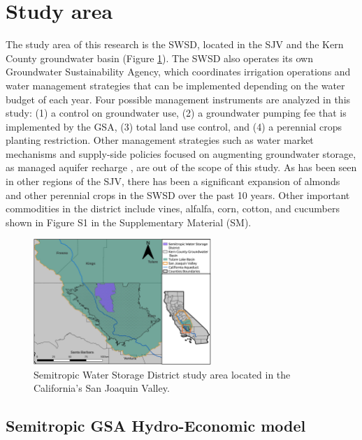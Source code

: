 \documentclass[a4paper,fleqn]{cas-sc}
\begin{document}
\section{Study area}

The study area of this research is the SWSD, located in the SJV and the Kern County groundwater basin (Figure \ref{fig:2}). The SWSD also operates its own Groundwater Sustainability Agency, which  coordinates irrigation operations and water management strategies that can be implemented depending on the water budget of each year. Four possible management instruments are analyzed in this study: (1) a control on groundwater use, (2) a groundwater pumping fee that is implemented by the GSA, (3) total land use control, and (4) a perennial crops planting restriction. Other management strategies such as water market mechanisms and supply-side policies focused on augmenting groundwater storage, as managed aquifer recharge \citep{ulibarri_assessing_2021}, are out of the scope of this study. As has been seen in other regions of the SJV, there has been a significant expansion of almonds and other perennial crops in the SWSD over the past 10 years. Other important commodities in the district include vines, alfalfa, corn, cotton, and cucumbers shown in Figure S1 in the Supplementary Material (SM). 
  

\begin{figure}[ht]
    \centering
    \includegraphics[width=0.6\textwidth,center]{Map_Semitropic.jpg}
    \caption{Semitropic Water Storage District study area located in the California’s San Joaquin Valley.}
    \label{fig:2}
\end{figure}

\subsection{Semitropic GSA Hydro-Economic model}
\end{document}
